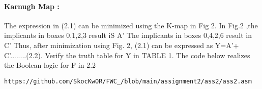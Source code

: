 \documentclass[10pt, a4paper]{article}
\begin{document}
    \paragraph{Karnugh Map :}
The expression in (2.1) can be minimized using the K-map in Fig 2. In Fig.2 ,the implicants in boxes 0,1,2,3 result iS A'
The implicants in boxes 0,4,2,6 result in C'
Thus, after minimization using Fig. 2, (2.1) can
be expressed as
Y=A'+ C'........(2.2).
Verify the truth table for Y in TABLE 1.
The code below realizes the Boolean logic for F in 2.2
\begin{lstlisting}
https://github.com/SkocKwOR/FWC_/blob/main/assignment2/ass2/ass2.asm
\end{lstlisting}

\end{document}
